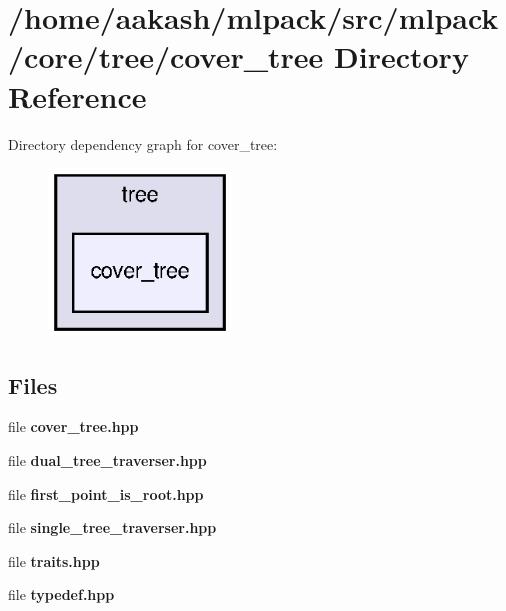 \section{/home/aakash/mlpack/src/mlpack/core/tree/cover\+\_\+tree Directory Reference}
\label{dir_8909127a93079ea6b332007d78eda270}
Directory dependency graph for cover\+\_\+tree\+:
\nopagebreak
\begin{figure}[H]
\begin{center}
\leavevmode
\includegraphics[width=138pt]{dir_8909127a93079ea6b332007d78eda270_dep}
\end{center}
\end{figure}
\subsection*{Files}
\begin{DoxyCompactItemize}
\item 
file \textbf{ cover\+\_\+tree.\+hpp}
\item 
file \textbf{ dual\+\_\+tree\+\_\+traverser.\+hpp}
\item 
file \textbf{ first\+\_\+point\+\_\+is\+\_\+root.\+hpp}
\item 
file \textbf{ single\+\_\+tree\+\_\+traverser.\+hpp}
\item 
file \textbf{ traits.\+hpp}
\item 
file \textbf{ typedef.\+hpp}
\end{DoxyCompactItemize}

